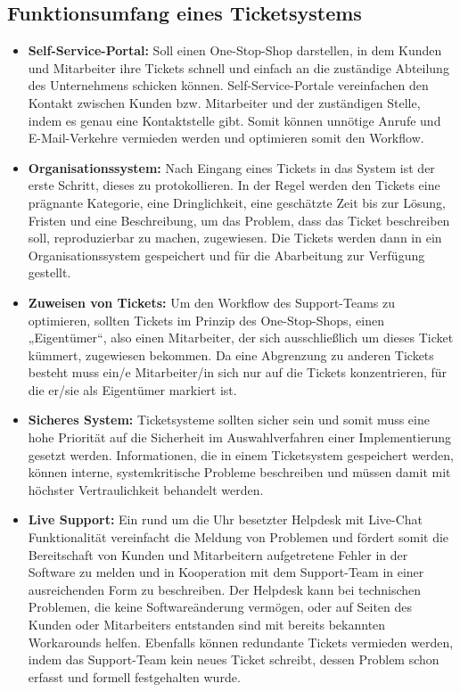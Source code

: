 \subsection{Funktionsumfang eines Ticketsystems}
\begin{itemize}
	\item \textbf{Self-Service-Portal:} Soll einen One-Stop-Shop darstellen, in dem Kunden und Mitarbeiter ihre Tickets schnell und einfach an die zuständige Abteilung des Unternehmens schicken können. Self-Service-Portale vereinfachen den Kontakt zwischen Kunden bzw. Mitarbeiter und der zuständigen Stelle, indem es genau eine Kontaktstelle gibt. Somit können unnötige Anrufe und E-Mail-Verkehre vermieden werden und optimieren somit den Workflow.
	\item \textbf{Organisationssystem:} Nach Eingang eines Tickets in das System ist der erste Schritt, dieses zu protokollieren. In der Regel werden den Tickets eine prägnante Kategorie, eine Dringlichkeit, eine geschätzte Zeit bis zur Lösung, Fristen und eine Beschreibung, um das Problem, dass das Ticket beschreiben soll, reproduzierbar zu machen, zugewiesen. Die Tickets werden dann in ein Organisationssystem gespeichert und für die Abarbeitung zur Verfügung gestellt.
	\item \textbf{Zuweisen von Tickets:} Um den Workflow des Support-Teams zu optimieren, sollten Tickets im Prinzip des One-Stop-Shops, einen „Eigentümer“, also einen Mitarbeiter, der sich ausschließlich um dieses Ticket kümmert, zugewiesen bekommen. Da eine Abgrenzung zu anderen Tickets besteht muss ein/e Mitarbeiter/in sich nur auf die Tickets konzentrieren, für die er/sie als Eigentümer markiert ist.
	\item \textbf{Sicheres System:} Ticketsysteme sollten sicher sein und somit muss eine hohe Priorität auf die Sicherheit im Auswahlverfahren einer Implementierung gesetzt werden. Informationen, die in einem Ticketsystem gespeichert werden, können interne, systemkritische Probleme beschreiben und müssen damit mit höchster Vertraulichkeit behandelt werden.
	\item \textbf{Live Support:} Ein rund um die Uhr besetzter Helpdesk mit Live-Chat Funktionalität vereinfacht die Meldung von Problemen und fördert somit die Bereitschaft von Kunden und Mitarbeitern aufgetretene Fehler in der Software zu melden und in Kooperation mit dem Support-Team in einer ausreichenden Form zu beschreiben. Der Helpdesk kann bei technischen Problemen, die keine Softwareänderung vermögen, oder auf Seiten des Kunden oder Mitarbeiters entstanden sind mit bereits bekannten Workarounds helfen. Ebenfalls können redundante Tickets vermieden werden, indem das Support-Team kein neues Ticket schreibt, dessen Problem schon erfasst und formell festgehalten wurde.
\end{itemize}

